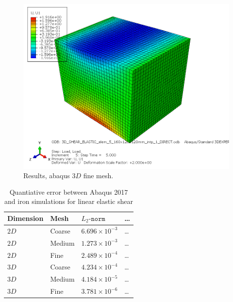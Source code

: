\begin{figure}[h!]
    \centering 
    \includegraphics[width=\columnwidth]{examples/example-0102/doc/figures/3D_SHEAR_ELASTIC_elem_5_160x120x120mm_intp_1_DIRECTU1.png} 
    \caption{Results, abaqus $3D$ fine mesh.}
    \label{example-0102-abaqus-3D-fig}
\end{figure}
%
\begin{table}
	\centering
    \begin{tabular}{llll}
    Dimension & Mesh 		& $L_2\texttt{-norm}$			& \ldots \\ \hline
    $2D$      & Coarse 	& $6.696\times 10^{-3}$	& \ldots \\
    $2D$      & Medium  & $1.273\times 10^{-3}$	& \ldots \\
    $2D$      & Fine  	& $2.489\times 10^{-4}$	& \ldots \\
    $3D$      & Coarse  & $4.234\times 10^{-4}$	& \ldots \\
    $3D$      & Medium  & $4.184\times 10^{-5}$	& \ldots \\
		$3D$			&	Fine 		&	$3.781\times 10^{-6}$	& \ldots 
    \end{tabular}
		\caption{Quantiative error between Abaqus 2017 and iron simulations for linear elastic shear}
		\label{tab:example-0102-valid-Iron-Abaqus}
\end{table}
